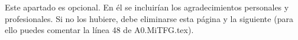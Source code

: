 
\pagestyle{fancy}



Este apartado es opcional. En él se incluirían los agradecimientos personales y profesionales. Si no los hubiere, debe eliminarse esta página y la siguiente (para ello puedes comentar la línea 48 de A0.MiTFG.tex).

\chapterend


\blankpage
